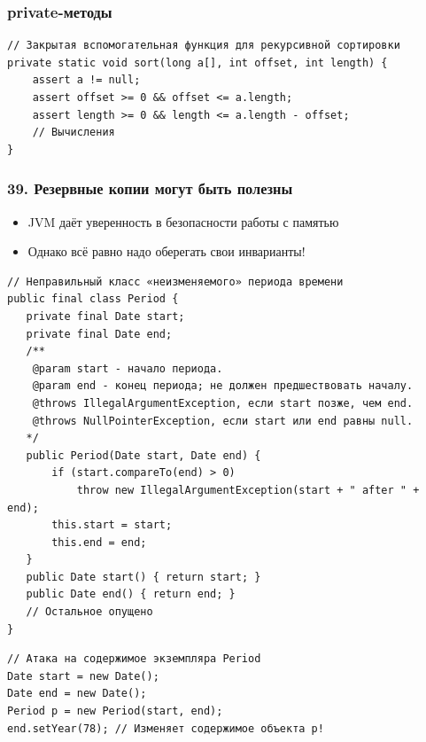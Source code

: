 \documentclass[xetex,mathserif,serif]{beamer}
\begin{document}
	\begin{frame}[fragile]
		\frametitle{private-методы}
		\begin{small}
			\begin{verbatim}
// Закрытая вспомогательная функция для рекурсивной сортировки
private static void sort(long a[], int offset, int length) {
    assert a != null;
    assert offset >= 0 && offset <= a.length;
    assert length >= 0 && length <= a.length - offset;
    // Вычисления
}
			\end{verbatim}
		\end{small}
	\end{frame}

	\begin{frame}
		\frametitle{39. Резервные копии могут быть полезны}
		\begin{itemize}
			\item JVM даёт уверенность в безопасности работы с памятью
			\item Однако всё равно надо оберегать свои инварианты!
		\end{itemize}
	\end{frame}

	\begin{frame}[fragile]
		\begin{small}
			\begin{verbatim}
// Неправильный класс «неизменяемого» периода времени
public final class Period {
   private final Date start;
   private final Date end;
   /**
    @param start - начало периода.
    @param end - конец периода; не должен предшествовать началу.
    @throws IllegalArgumentException, если start позже, чем end.
    @throws NullPointerException, если start или end равны null.
   */
   public Period(Date start, Date end) {
       if (start.compareTo(end) > 0)
           throw new IllegalArgumentException(start + " after " + end);
       this.start = start;
       this.end = end;
   }
   public Date start() { return start; }
   public Date end() { return end; }
   // Остальное опущено
}
			\end{verbatim}
		\end{small}
	\end{frame}

	\begin{frame}[fragile]
		\begin{verbatim}
// Атака на содержимое экземпляра Period
Date start = new Date();
Date end = new Date();
Period p = new Period(start, end);
end.setYear(78); // Изменяет содержимое объекта p!
		\end{verbatim}
	\end{frame}
\end{document}

